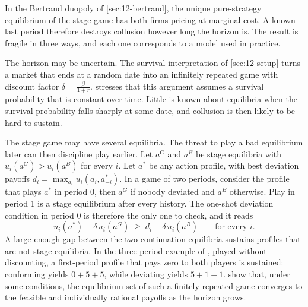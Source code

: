 In the Bertrand duopoly of \cref{sec:12-bertrand}, the unique pure-strategy equilibrium of the stage game has both
firms pricing at marginal cost. A known last period therefore destroys collusion however long the horizon is. The
result is fragile in three ways, and each one corresponds to a model used in practice.

The horizon may be uncertain. The survival interpretation of \cref{sec:12-setup} turns a market that ends at a
random date into an infinitely repeated game with discount factor $\delta = \frac{\beta}{1 + r}$.
\citet[section~6.3.4.2]{Tirole1988} stresses that this argument assumes a survival probability that is constant
over time. Little is known about equilibria when the survival probability falls sharply at some date, and collusion
is then likely to be hard to sustain.

The stage game may have several equilibria. The threat to play a bad equilibrium later can then discipline play
earlier. Let $a^G$ and $a^B$ be stage equilibria with $u_i(a^G) > u_i(a^B)$ for every $i$. Let $a^*$ be any action
profile, with best deviation payoffs $d_i = \max_{a_i}u_i(a_i, a^*_{-i})$. In a game of two periods, consider the
profile that plays $a^*$ in period 0, then $a^G$ if nobody deviated and $a^B$ otherwise. Play in period 1 is a stage
equilibrium after every history. The one-shot deviation condition in period 0 is therefore the only one to check,
and it reads
\begin{equation}\label{eq:12-finite-multiple}
u_i(a^*) + \delta\,u_i(a^G) \;\ge\; d_i + \delta\,u_i(a^B) \qquad \text{for every } i .
\end{equation}
A large enough gap between the two continuation equilibria sustains profiles that are not stage equilibria. In the
three-period example of \citet[section~6.7.3.2]{Tirole1988}, played without discounting, a first-period profile
that pays zero to both players is sustained: conforming yields $0 + 5 + 5$, while deviating yields $5 + 1 + 1$.
\citet{BenoitKrishna1985} show that, under some conditions, the equilibrium set of such a finitely repeated game
converges to the feasible and individually rational payoffs as the horizon grows.

